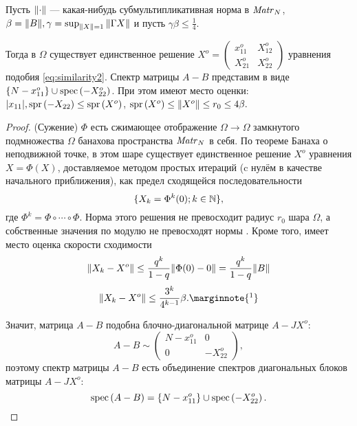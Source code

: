 \begin{lemma}
    Пусть \( {\left\|{\cdot}\right\|} \) --- какая-нибудь субмультипликативная норма в \( \mathit{Matr}_{N} {} \),
    \( \beta={\left\|{B}\right\|}, \gamma=\sup_{{\left\|{X}\right\|}=1}{\left\|{\Gamma X}\right\|} \)
    и пусть
    \( \gamma\beta\leq\frac14. \)

    Тогда в \( \Omega \) существует единственное решение
    \( X^o = \begin{pmatrix}
        x_{11}^o & X_{12}^o \\
        X_{21}^o & X_{22}^o
    \end{pmatrix}\) уравнения подобия
    \eqref{eq:similarity2}.
    Спектр матрицы \( A - B \) представим в виде
    \( \left\{ N - x_{11}^o \right\} \cup \mathrm{spec}\left({-X_{22}^o}\right) \).
    При этом имеют место оценки:
    \( \lvert x_{11} \rvert, \mathrm{spr}\left({-X_{22}}\right) \leq \mathrm{spr}\left({X^o}\right) \),
    \(
        \mathrm{spr}\left({X^o}\right) \leq {\left\|{X^o}\right\|} \leq r_0 \leq 4\beta.
        \)
\end{lemma}
\begin{proof}
    (Сужение) \( \Phi \) есть сжимающее отображение \( \Omega\to\Omega \)
    замкнутого подмножества \( \Omega \)
    банахова пространства \( \mathit{Matr}_{N} {} \) в себя.
    По теореме Банаха о неподвижной точке, в этом шаре существует единственное решение \( X^o \)
    уравнения \( X = \Phi (X) \),
    доставляемое методом простых итераций (c нулём в качестве начального приближения),
    как предел сходящейся последовательности
    \[
        \{X_k = \Phi^k(0); k\in\mathbb{N}\},
        \]
    где \( \Phi^k = \Phi \circ \cdots \circ \Phi \).
    Норма этого решения не превосходит радиус \( r_0 \) шара \( \Omega \),
    а собственные значения по модулю не превосходят нормы \cite{baskakov-harmonic}.
    Кроме того, имеет место оценка скорости сходимости
    \[
        {\left\|{X_k - X^o}\right\|} \leq \frac{q^k}{1-q} {\left\|{\Phi(0) - 0}\right\|} = \frac{q^k}{1-q}{\left\|{B}\right\|}
        \]
    \[
        \norm{X_k - X^o} \leq \frac{3^k}{4^{k-1}}\beta. \marginnote{\footnotemark}
        \]

    Значит, матрица \( A-B \) подобна блочно-диагональной матрице \( A - JX^o \):
    \[
        A-B \sim
    \begin{pmatrix}
        N - x_{11}^o & 0 \\
        0            & -X_{22}^o
    \end{pmatrix},
    \]
    поэтому спектр матрицы \( A - B \) есть объединение спектров
    диагональных блоков матрицы \( A - JX^o \):
    \[ \mathrm{spec}\left({A-B}\right) = \left\{N - x_{11}^o\right\} \cup \mathrm{spec}\left({-X_{22}^o}\right). \]
\end{proof}
